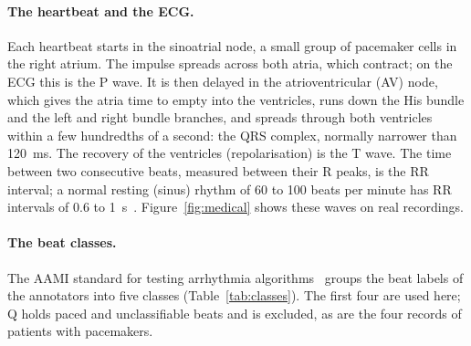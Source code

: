 \documentclass[11pt]{article}
\begin{document}
\paragraph{The heartbeat and the ECG.} Each heartbeat starts in the sinoatrial node, a small group of pacemaker cells in the right
atrium. The impulse spreads across both atria, which contract; on the ECG this is the P wave. It is then delayed in the
atrioventricular (AV) node, which gives the atria time to empty into the ventricles, runs down the His bundle and the left and right
bundle branches, and spreads through both ventricles within a few hundredths of a second: the QRS complex, normally narrower than
120~ms. The recovery of the ventricles (repolarisation) is the T wave. The time between two consecutive beats, measured between their
R peaks, is the RR interval; a normal resting (sinus) rhythm of 60 to 100 beats per minute has RR intervals of 0.6 to
1~s~\cite{goldberger2017}. Figure~\ref{fig:medical} shows these waves on real recordings.

\paragraph{The beat classes.} The AAMI standard for testing arrhythmia algorithms~\cite{aami2012ec57} groups the beat labels of the
annotators into five classes (Table~\ref{tab:classes}). The first four are used here; Q holds paced and unclassifiable beats and is
excluded, as are the four records of patients with pacemakers.
\end{document}
